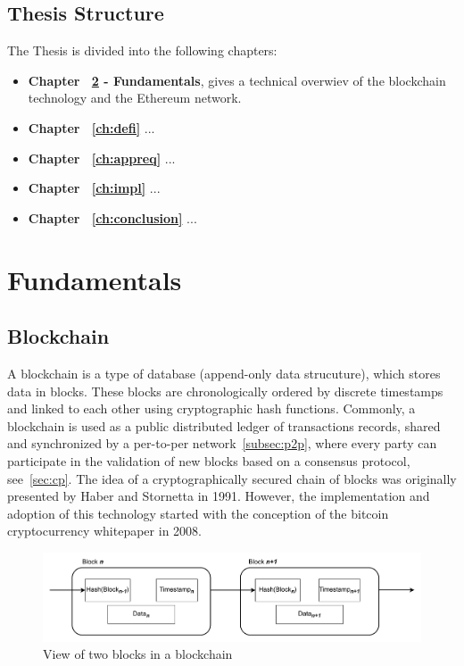 \documentclass[11pt,a4paper]{report}
\begin{document}
\section{Thesis Structure}
The Thesis is divided into the following chapters:
\begin{itemize}
	
	\item \textbf{Chapter ~\ref{ch:background} - Fundamentals}, gives a technical overwiev of the blockchain technology and the Ethereum network.
	\item \textbf{Chapter ~\ref{ch:defi}} ...
	\item \textbf{Chapter ~\ref{ch:appreq}} ...
	\item \textbf{Chapter ~\ref{ch:impl}} ...
	\item \textbf{Chapter ~\ref{ch:conclusion}} ...
\end{itemize}


\chapter{Fundamentals} \label{ch:background}

\section{Blockchain} \label{sec:bc}
A blockchain\cite{book:bc}\cite{article:bc} is a type of database (append-only data strucuture), which stores data in blocks. These blocks are chronologically ordered by discrete timestamps and linked to each other using cryptographic hash functions\cite{chf}\cite{book:chf}. Commonly, a blockchain is used as a public distributed ledger of transactions records, shared and synchronized by a per-to-per network~\ref{subsec:p2p}, where every party can participate in the validation of new blocks based on a consensus protocol, see~\ref{sec:cp}.
The idea of a cryptographically secured chain of blocks was originally presented by Haber and Stornetta\cite{time-stamp} in 1991. However, the implementation and adoption of this technology started with the conception of the bitcoin cryptocurrency whitepaper\cite{bitcoin} in 2008.

\begin{figure}[htp]
	\centering
	\includegraphics[width=1\textwidth]{./images/bc}
	\caption{View of two blocks in a blockchain}
	\label{fig:bc}
\end{figure}
\end{document}
